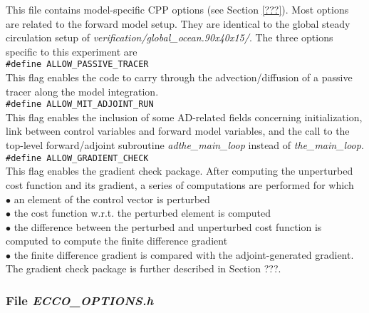 This file contains model-specific CPP options
(see Section \ref{???}).
Most options are related to the forward model setup.
They are identical to the global steady circulation setup of
{\it verification/global\_ocean.90x40x15/}.
The three options specific to this experiment are \\
\hspace*{4ex} {\tt \#define ALLOW\_PASSIVE\_TRACER} \\
This flag enables the code to carry through the
advection/diffusion of a passive tracer along the
model integration. \\
\hspace*{4ex} {\tt \#define ALLOW\_MIT\_ADJOINT\_RUN} \\
This flag enables the inclusion of some AD-related fields
concerning initialization, link between control variables
and forward model variables, and the call to the top-level
forward/adjoint subroutine {\it adthe\_main\_loop}
instead of {\it the\_main\_loop}. \\
\hspace*{4ex} {\tt \#define ALLOW\_GRADIENT\_CHECK} \\
This flag enables the gradient check package.
After computing the unperturbed cost function and its gradient,
a series of computations are performed for which \\
$\bullet$ an element of the control vector is perturbed \\
$\bullet$ the cost function w.r.t. the perturbed element is
computed \\
$\bullet$ the difference between the perturbed and unperturbed
cost function is computed to compute the finite difference gradient \\
$\bullet$ the finite difference gradient is compared with the
adjoint-generated gradient.
The gradient check package is further described in Section ???.

\subsubsection{File {\it ECCO\_OPTIONS.h}}
\label{www:tutorials}

